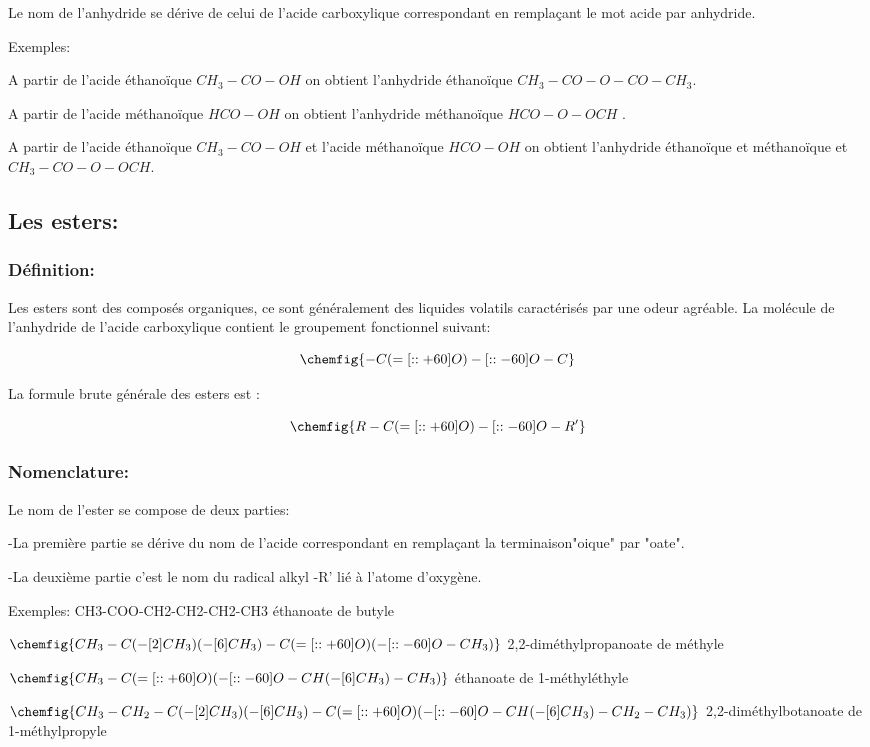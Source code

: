 \documentclass[12pt]{article}
\begin{document}
Le nom de l'anhydride se dérive de celui de l'acide carboxylique correspondant en remplaçant le mot acide par
anhydride.

Exemples:

A partir de l'acide éthanoïque $CH_3-CO-OH$ on obtient l'anhydride éthanoïque $CH_3-CO-O-CO-CH_3$.

A partir de l'acide méthanoïque $HCO-OH$ on obtient l'anhydride méthanoïque $HCO-O-OCH$ .

A partir de l'acide éthanoïque $CH_3-CO-OH$ et l'acide méthanoïque $HCO-OH$ on obtient l'anhydride éthanoïque et
méthanoïque et $CH_3-CO-O-OCH$.


\subsection{Les esters:}
\subsubsection{Définition:}
Les esters sont des composés organiques, ce sont généralement des liquides volatils caractérisés par une odeur
agréable.
La molécule de l'anhydride de l'acide carboxylique contient le groupement fonctionnel suivant:

$$\chemfig{-C(=[::+60]O)-[::-60]O-C}$$

La formule brute générale des esters est :


$$\chemfig{R-C(=[::+60]O)-[::-60]O-R'}$$


\subsubsection{Nomenclature:}
Le nom de l'ester se compose de deux parties:

-La première partie se dérive du nom de l'acide correspondant en remplaçant la terminaison"oique" par "oate".

-La deuxième partie c'est le nom du radical alkyl -R' lié à l'atome d'oxygène.

Exemples: CH3-COO-CH2-CH2-CH2-CH3 éthanoate de butyle

$\chemfig{CH_3-C(-[2]CH_3)(-[6]CH_3)-C(=[::+60]O)(-[::-60]O-CH_3)}$
2,2-diméthylpropanoate de méthyle

$\chemfig{CH_3-C(=[::+60]O)(-[::-60]O-CH(-[6]CH_3)-CH_3)}$
éthanoate de 1-méthyléthyle


$\chemfig{CH_3-CH_2-C(-[2]CH_3)(-[6]CH_3)-C(=[::+60]O)(-[::-60]O-CH(-[6]CH_3)-CH_2-CH_3)}$
2,2-diméthylbotanoate de 1-méthylpropyle
\end{document}
